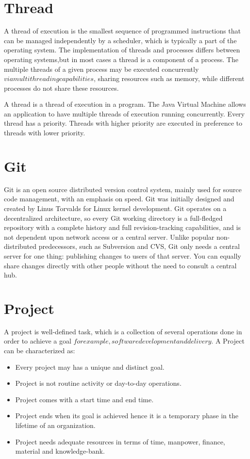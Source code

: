     \noindent
    \section{Thread}\label{sec:thread}
    A thread of execution is the smallest sequence of programmed instructions that can be managed
    independently by a scheduler, which is typically a part of the operating system.
    The implementation of threads and processes differs between operating systems,but in most cases
    a thread is a component  of a process.
    The multiple threads of a given process may be executed concurrently
    \(via multithreading capabilities\), sharing resources such as memory, while different
    processes do not share these resources.
    \medskip

	\noindent
    A thread is a thread of execution in a program.
    The Java Virtual Machine allows an application to have multiple threads of execution running
    concurrently.
    Every thread has a priority.
    Threads with higher priority are executed in preference to threads with lower priority.

    \section{Git}\label{sec:git}
    Git is an open source distributed version control system, mainly used for source code
    management, with an emphasis on speed.
    Git was initially designed and created by Linus Torvalds for Linux kernel development.
    Git operates on a decentralized architecture, so every Git working directory is a
    full-fledged repository with a complete history and full revision-tracking capabilities,
    and is not dependent upon network access or a central server.
    Unlike popular non-distributed predecessors, such as Subversion and CVS, Git only needs a
    central server for one thing: publishing changes to users of that server.
    You can equally share changes directly with other people without the need to consult a central hub.

    \section{Project}\label{sec:project}
    A project is well-defined task, which is a collection of several operations done in order to
    achieve a goal \(for example, software development and delivery\).
    \medskip
    \noindent
    A Project can be characterized as:
    \begin{itemize}
        \item Every project may has a unique and distinct goal.
        \item Project is not routine activity or day-to-day operations.
        \item Project comes with a start time and end time.
        \item Project ends when its goal is achieved hence it is a temporary phase in the lifetime
                of an organization.
        \item Project needs adequate resources in terms of time, manpower, finance, material and
                knowledge-bank.
    \end{itemize}

